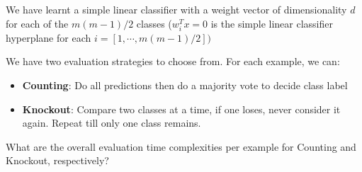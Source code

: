 \documentclass[11pt]{article}
\begin{document}
\begin{enumerate}
We have learnt a simple linear classifier with a weight vector of dimensionality $d$ for each of the $ m(m-1)/2$ classes ($w_i^T x = 0$ is the simple linear classifier hyperplane for each  $i =[1, \cdots , m(m-1)/2] )$

We have two evaluation strategies to choose from. For each example, we can:
\begin{itemize}
  \item \textbf{Counting}: Do all predictions then do a majority vote to decide class label
  \item \textbf{Knockout}: Compare two classes at a time, if one loses, never consider it
again. Repeat till only one class remains.
\end{itemize}
What are the overall evaluation time complexities per example for Counting and
Knockout, respectively?
\end{enumerate}
\end{document}
